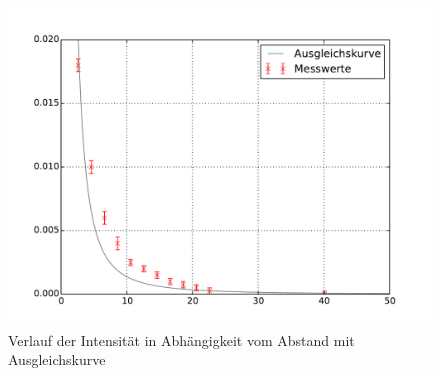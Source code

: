	
	\begin{figure}[!h]
		\centering
		\includegraphics[scale=0.75]{Grafiken/Abstand.pdf}
		\caption{Verlauf der Intensität in Abhängigkeit vom Abstand mit Ausgleichskurve}
		\label{fig:Abstand}
	\end{figure}